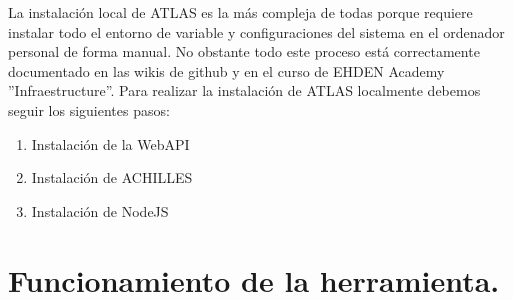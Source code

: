 \documentclass{article}
\begin{document}
La instalación local de ATLAS es la más compleja de todas porque requiere instalar todo el entorno de variable y configuraciones del sistema en el ordenador personal de forma manual. No obstante todo este proceso está correctamente documentado en las wikis de github \cite{AtlasSetup} y en el curso de EHDEN Academy \cite{EHDENAcademy} ''Infraestructure''. Para realizar la instalación de ATLAS localmente debemos seguir los siguientes pasos:

\begin{enumerate}
    \item Instalación de la WebAPI
    \item Instalación de ACHILLES
    \item Instalación de NodeJS
\end{enumerate}



\newpage
\section{Funcionamiento de la herramienta.}




\newpage


\end{document}
